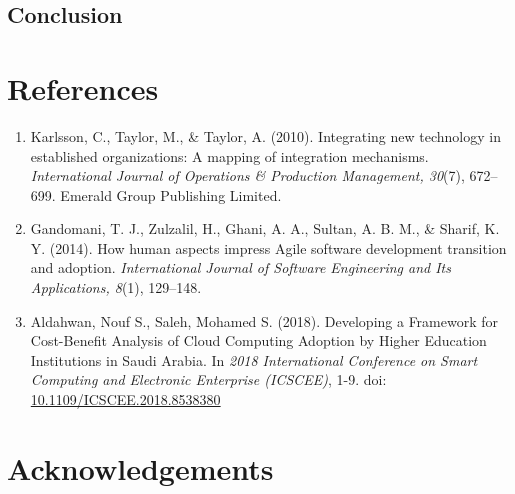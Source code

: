 \documentclass{article}
\begin{document}
\subsection{Conclusion}
\lipsum[28]

\section{References}
\begin{enumerate}
    \item Karlsson, C., Taylor, M., \& Taylor, A. (2010). Integrating new technology in established organizations: A mapping of integration mechanisms. \textit{International Journal of Operations \& Production Management, 30}(7), 672--699. Emerald Group Publishing Limited.
  
    \item Gandomani, T. J., Zulzalil, H., Ghani, A. A., Sultan, A. B. M., \& Sharif, K. Y. (2014). How human aspects impress Agile software development transition and adoption. \textit{International Journal of Software Engineering and Its Applications, 8}(1), 129--148.

    \item Aldahwan, Nouf S., Saleh, Mohamed S. (2018). Developing a Framework for Cost-Benefit Analysis of Cloud Computing Adoption by Higher Education Institutions in Saudi Arabia. In \textit{2018 International Conference on Smart Computing and Electronic Enterprise (ICSCEE)}, 1-9. doi: \url{10.1109/ICSCEE.2018.8538380}


\end{enumerate}

\section{Acknowledgements}
\lipsum[29]
\end{document}
